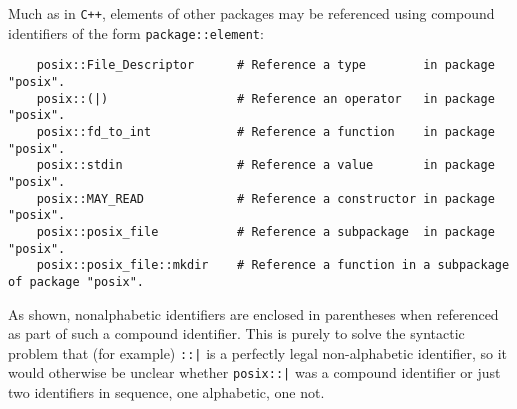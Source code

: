 Much as in {\tt C++}, elements of other packages may be referenced using compound 
identifiers of the form {\tt package::element}:

\begin{verbatim}
    posix::File_Descriptor      # Reference a type        in package "posix".
    posix::(|)                  # Reference an operator   in package "posix".
    posix::fd_to_int            # Reference a function    in package "posix".
    posix::stdin                # Reference a value       in package "posix".
    posix::MAY_READ             # Reference a constructor in package "posix".
    posix::posix_file           # Reference a subpackage  in package "posix".
    posix::posix_file::mkdir    # Reference a function in a subpackage of package "posix".
\end{verbatim}

As shown, nonalphabetic identifiers are enclosed in parentheses when referenced as part of such 
a compound identifier.  This is purely to solve the syntactic problem that 
(for example) {\tt ::|} is a perfectly legal non-alphabetic identifier, so 
it would otherwise be unclear whether {\tt posix::|} was a compound identifier 
or just two identifiers in sequence, one alphabetic, one not.

\cutend*

